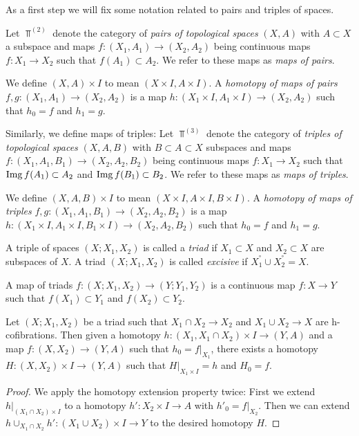 As a first step we will fix some notation related to pairs and triples of spaces. 
\begin{definition}
    Let $\Top^{(2)}$ denote the category of \emph{pairs of topological spaces} $(X,A)$ with $A\subset X$ a subspace and maps $f\colon(X_1,A_1)\to (X_2,A_2)$ being continuous maps $f\colon X_1\to X_2$ such that $f(A_1)\subset A_2$.
    We refer to these maps as \emph{maps of pairs}.
    
    We define $(X,A)\times I$ to mean $(X\times I,A\times I)$.
    A \emph{homotopy of maps of pairs} $f,g\colon(X_1,A_1)\to (X_2,A_2)$ is a map $h\colon(X_1\times I,A_1\times I)\to (X_2,A_2)$ such that $h_0=f$ and $h_1=g$.

    Similarly, we define maps of triples:
    Let $\Top^{(3)}$ denote the category of \emph{triples of topological spaces} $(X,A,B)$ with $B\subset A\subset X$ subspaces and maps $f\colon(X_1,A_1,B_1)\to (X_2,A_2,B_2)$ being continuous maps $f\colon X_1\to X_2$ such that $\operatorname{Img} f(A_1)\subset A_2$ and $\operatorname{Img} f(B_1)\subset B_2$.
    We refer to these maps as \emph{maps of triples}.
    
    We define $(X,A,B)\times I$ to mean $(X\times I,A\times I, B\times I)$.
    A \emph{homotopy of maps of triples} $f,g\colon(X_1,A_1,B_1)\to (X_2,A_2,B_2)$ is a map $h\colon(X_1\times I,A_1\times I,B_1\times I)\to (X_2,A_2,B_2)$ such that $h_0=f$ and $h_1=g$.
\end{definition}
\begin{definition}[Triad]
    A triple of spaces $(X;X_1,X_2)$ is called a \emph{triad} if $X_1\subset X$ and $X_2\subset X$ are subspaces of $X$.
    A triad $(X;X_1,X_2)$ is called \emph{excisive} if $X_1^°\cup X_2^°=X$.

    A map of triads $f\colon (X;X_1,X_2)\to (Y;Y_1,Y_2)$ is a continuous map $f\colon X\to Y$ such that $f(X_1)\subset Y_1$ and $f(X_2)\subset Y_2$.
\end{definition}
\begin{lemma}\label{lem:rHEP}
    Let $(X;X_1,X_2)$ be a triad such that $X_1\cap X_2\to X_2$ and $X_1\cup X_2\to X$ are h-cofibrations. 
    Then given a homotopy $h\colon(X_1,X_1\cap X_2)\times I\to(Y,A)$ and a map $f\colon(X,X_2)\to(Y,A)$ such that $h_0=f|_{X_1}$, there exists a homotopy $H\colon(X,X_2)\times I\to(Y,A)$ such that $H|_{X_1\times I}=h$ and $H_0=f$.
    \begin{proof}
        We apply the homotopy extension property twice: First we extend $h|_{\left(X_1\cap X_2\right)\times I}$ to a homotopy $h'\colon X_2\times I\to A$ with $h'_0=f|_{X_2}$.
        Then we can extend $h\cup_{X_1\cap X_2} h'\colon \left(X_1\cup X_2\right)\times I\to Y$ to the desired homotopy $H$.
    \end{proof}
\end{lemma}
